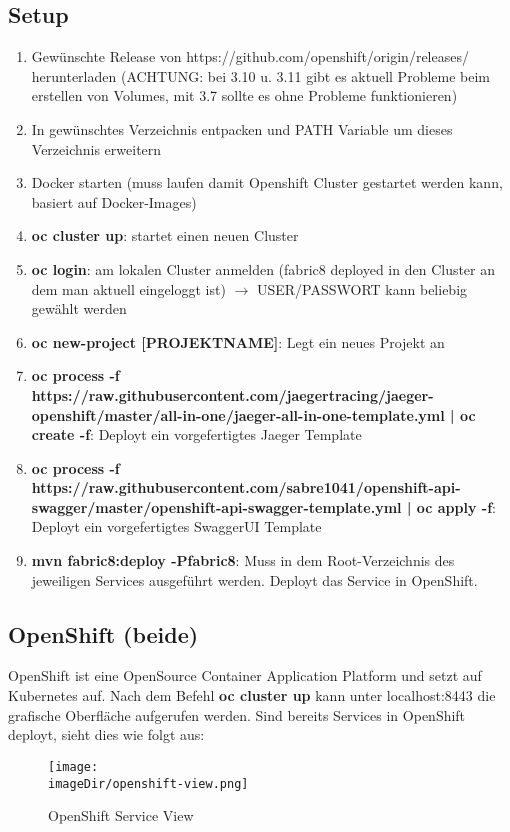 \documentclass[11pt, a4paper, twoside]{article}   	%
\newcommand{\imageDir}{../../images}
\begin{document}
\subsection{Setup}
\begin{enumerate}
	\item Gewünschte Release von https://github.com/openshift/origin/releases/ herunterladen 
	(ACHTUNG: bei 3.10 u. 3.11 gibt es aktuell Probleme beim erstellen von Volumes, mit 3.7 sollte es ohne Probleme funktionieren)
	\item In gewünschtes Verzeichnis entpacken und PATH Variable um dieses Verzeichnis erweitern
	\item Docker starten (muss laufen damit Openshift Cluster gestartet werden kann, basiert auf Docker-Images)
	\item \textbf{oc cluster up}: startet einen neuen Cluster
	\item \textbf{oc login}: am lokalen Cluster anmelden (fabric8 deployed in den Cluster an dem man aktuell eingeloggt ist) $\rightarrow$ USER/PASSWORT kann beliebig gewählt werden
	\item \textbf{oc new-project [PROJEKTNAME]}: Legt ein neues Projekt an
	\item \textbf{oc process -f https://raw.githubusercontent.com/jaegertracing/jaeger-openshift/master/all-in-one/jaeger-all-in-one-template.yml | oc create -f}: Deployt ein vorgefertigtes Jaeger Template
	\item \textbf{oc process -f https://raw.githubusercontent.com/sabre1041/openshift-api-swagger/master/openshift-api-swagger-template.yml | oc apply -f}: Deployt ein vorgefertigtes SwaggerUI Template
	\item \textbf{mvn fabric8:deploy -Pfabric8}: Muss in dem Root-Verzeichnis des jeweiligen Services ausgeführt werden. Deployt das Service in OpenShift.
\end{enumerate}

\subsection{OpenShift (beide)}
OpenShift ist eine OpenSource Container Application Platform und setzt auf Kubernetes auf.
Nach dem Befehl \textbf{oc cluster up} kann unter localhost:8443 die grafische Oberfläche aufgerufen werden.
Sind bereits Services in OpenShift deployt, sieht dies wie folgt aus:
\begin{figure}[h]
	\centering
	\texttt{[image: \\imageDir/openshift-view.png]}
	\caption{OpenShift Service View}
\end{figure}
\end{document}
